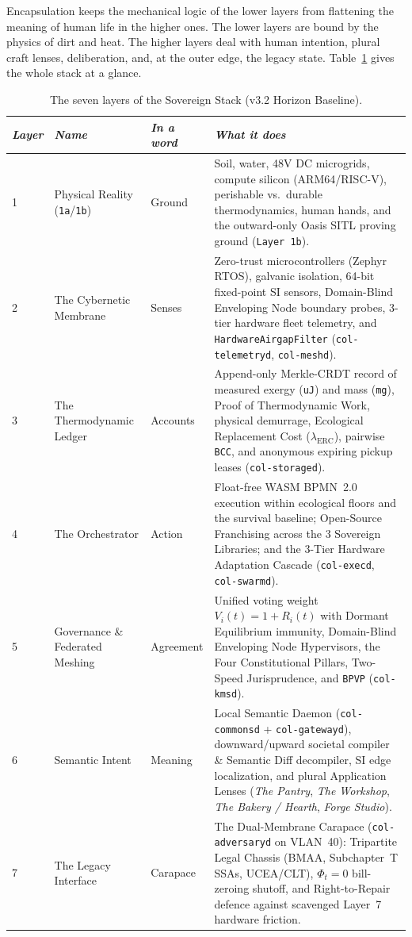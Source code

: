 Encapsulation keeps the mechanical logic of the lower layers from flattening the meaning of human life in the higher ones. The lower layers are bound by the physics of dirt and heat. The higher layers deal with human intention, plural craft lenses, deliberation, and, at the outer edge, the legacy state. Table~\ref{tab:stack-overview} gives the whole stack at a glance.

\begin{table}[htbp]
\centering
\small
\begin{tabular}{|p{}|p{}|p{}|p{}|}
\hline
\textit{Layer} & \textit{Name} & \textit{In a word} & \textit{What it does} \\
\hline
1 & Physical Reality (\texttt{1a}/\texttt{1b}) & Ground & Soil, water, 48V DC microgrids, compute silicon (ARM64/RISC-V), perishable vs.\ durable thermodynamics, human hands, and the outward-only Oasis SITL proving ground (\texttt{Layer 1b}). \\
\hline
2 & The Cybernetic Membrane & Senses & Zero-trust microcontrollers (Zephyr RTOS), galvanic isolation, 64-bit fixed-point SI sensors, Domain-Blind Enveloping Node boundary probes, 3-tier hardware fleet telemetry, and \texttt{HardwareAirgapFilter} (\texttt{col-telemetryd}, \texttt{col-meshd}). \\
\hline
3 & The Thermodynamic Ledger & Accounts & Append-only Merkle-CRDT record of measured exergy (\texttt{uJ}) and mass (\texttt{mg}), Proof of Thermodynamic Work, physical demurrage, Ecological Replacement Cost ($\lambda_{\mathrm{ERC}}$), pairwise \texttt{BCC}, and anonymous expiring pickup leases (\texttt{col-storaged}). \\
\hline
4 & The Orchestrator & Action & Float-free WASM BPMN~2.0 execution within ecological floors and the survival baseline; Open-Source Franchising across the 3 Sovereign Libraries; and the 3-Tier Hardware Adaptation Cascade (\texttt{col-execd}, \texttt{col-swarmd}). \\
\hline
5 & Governance \& Federated Meshing & Agreement & Unified voting weight $V_i(t) = 1 + R_i(t)$ with Dormant Equilibrium immunity, Domain-Blind Enveloping Node Hypervisors, the Four Constitutional Pillars, Two-Speed Jurisprudence, and \texttt{BPVP} (\texttt{col-kmsd}). \\
\hline
6 & Semantic Intent & Meaning & Local Semantic Daemon (\texttt{col-commonsd} + \texttt{col-gatewayd}), downward/upward societal compiler \& Semantic Diff decompiler, SI edge localization, and plural Application Lenses (\textit{The Pantry}, \textit{The Workshop}, \textit{The Bakery / Hearth}, \textit{Forge Studio}). \\
\hline
7 & The Legacy Interface & Carapace & The Dual-Membrane Carapace (\texttt{col-adversaryd} on VLAN~40): Tripartite Legal Chassis (BMAA, Subchapter~T SSAs, UCEA/CLT), $\Phi_t = 0$ bill-zeroing shutoff, and Right-to-Repair defence against scavenged Layer~7 hardware friction. \\
\hline
\end{tabular}
\caption{The seven layers of the Sovereign Stack (v3.2 Horizon Baseline).}
\label{tab:stack-overview}
\end{table}

